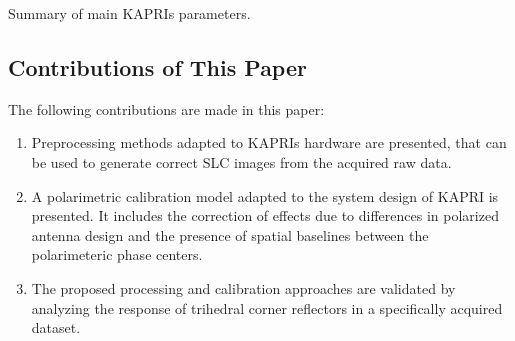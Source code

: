 \begin{table*}
	\centering
	\caption{Summary of main KAPRIs parameters.}
	\label{tab:kapri_parameters}
\end{table*}
\subsection{Contributions of This Paper}
The following contributions are made in this paper:
\begin{enumerate}
	\item Preprocessing methods adapted to KAPRIs hardware are presented, that can be used to generate correct SLC images from the acquired raw data.
	\item A polarimetric calibration model adapted to the system design of KAPRI is presented. It includes the correction of effects due to differences in polarized antenna design and the presence of spatial baselines between the polarimeteric phase centers.
	\item The proposed processing and calibration approaches are validated by analyzing the response of trihedral corner reflectors in a specifically acquired dataset.
\end{enumerate}
